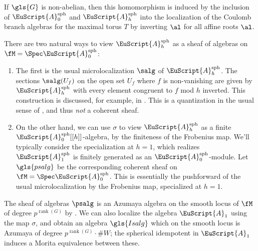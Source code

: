 If $\gls{G}$ is non-abelian, then this homomorphism is induced by the
inclusion of $\EuScript{A}_0^{\operatorname{sph}}$ and $\EuScript{A}_h^{\operatorname{sph}}$ into the
localization of the Coulomb branch algebras for the maximal torus $T$ by inverting $\al$ for all affine
roots $\al$.  

There are two natural ways to view $\EuScript{A}_h^{\operatorname{sph}}$ as a sheaf of algebras on $\fM=\Spec \EuScript{A}_0^{\operatorname{sph}}$:
\begin{enumerate}
\item The first is the usual microlocalization $\salg$ of
  $\EuScript{A}_h^{\operatorname{sph}}$. The sections $\salg(U_f)$ on the
  open set $U_f$ where $f$ is non-vanishing are given by
  $\EuScript{A}_h^{\operatorname{sph}}$ with every element congruent
  to $f$ mod $h$ inverted.  This construction is discussed, for example, in \cite[\S 4.1]{BLPWquant}.  This is a quantization in the usual sense
  of \cite{BKpos}, and thus {\it not} a coherent sheaf.

\item On the other hand, we can use $\sigma$ to view  $\EuScript{A}_h^{\operatorname{sph}}$ as a finite $\EuScript{A}_0^{\operatorname{sph}}[[h]]$-algebra, by the finiteness of the Frobenius map.  We'll typically consider the specialization at
$h=1$, which realizes $\EuScript{A}_1^{\operatorname{sph}}$ is finitely generated as an $\EuScript{A}_0^{\operatorname{sph}}$-module.  Let $\gls{psalg}$ be the corresponding coherent sheaf on $\fM=\Spec \EuScript{A}_0^{\operatorname{sph}}$.  This is essentially the 
pushforward of the usual microlocalization by the
Frobenius map, specialized at $h=1$.
\end{enumerate}


The sheaf of algebras $\psalg$ is an Azumaya
algebra on the smooth locus of $\fM$  of degree $p^{\operatorname{rank}(G)}$ by \cite[Lemma 3.2]{BKpos}.  We can also localize the algebra $\EuScript{A}_1$ using the map $\sigma$, and obtain an algebra $\gls{Isalg}$ which on the smooth locus is Azumaya of degree $p^{\operatorname{rank}(G)}\cdot \#W$; the spherical idempotent in $\EuScript{A}_1$ induces a Morita equivalence between these.

